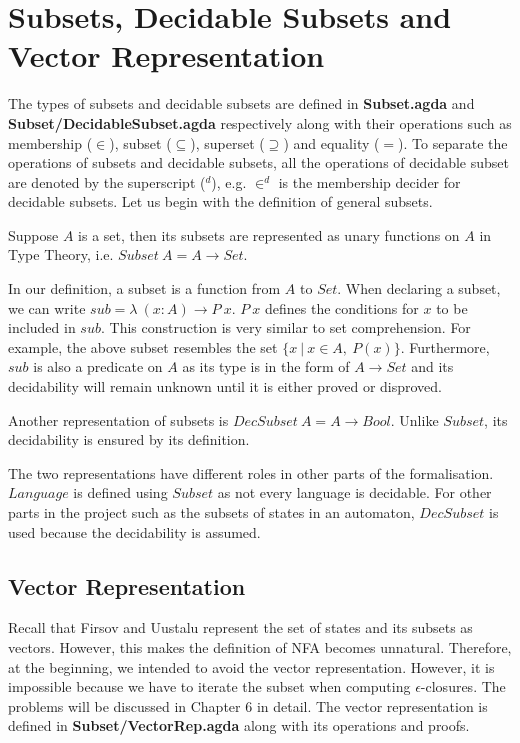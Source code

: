 \section{Subsets, Decidable Subsets and Vector Representation}
\par The types of subsets and decidable subsets are defined in
\textbf{Subset.agda} and \textbf{Subset/DecidableSubset.agda}
respectively along with their operations such as membership (\(\in\)), subset
(\(\subseteq\)), superset (\(\supseteq\)) and equality (\(=\)). To separate the
operations of subsets and decidable subsets, all the operations of
decidable subset are denoted by the superscript (\(^d\)), e.g. \(\in^d\)
is the membership decider for decidable subsets. Let us
begin with the definition of general subsets. 

\begin{defn} 
\noindent Suppose \(A\) is a set, then its
subsets are represented as unary functions on
\(A\) in Type Theory, i.e. \(Subset\ A = A \to Set\). 
\end{defn}

\par In our definition, a subset is a function from \(A\) to
\(Set\). When declaring a subset, we can write \(sub =
\lambda\ (x : A) \to P\ x\). \(P\ x\) defines the conditions for \(x\) to
be included in \(sub\). This construction is
very similar to set comprehension. For example, the above subset
resembles the set \(\{x\ | \ x \in A,\ P(x)\}\). Furthermore, \(sub\) is
also a predicate on \(A\) as its type is in the form of \(A \to
Set\) and its decidability will remain unknown until it is either proved or disproved. 

\begin{defn} 
\noindent Another representation of subsets is \(DecSubset\ A = A \to
Bool\). Unlike \(Subset\), its decidability is ensured by its
definition. 
\end{defn}

\par The two representations have different roles in other parts of the
formalisation. \(Language\) is defined using \(Subset\) as not every
language is decidable. For other parts in the project 
such as the subsets of states in an automaton, \(DecSubset\) is used
because the decidability is assumed. 


\subsection{Vector Representation}
\par Recall that Firsov and Uustalu \cite{firsov2013} represent the
set of states and its subsets as vectors. However, this makes the definition of
NFA becomes unnatural. Therefore, at the beginning, we intended to
avoid the vector representation. However, it is impossible because we have to iterate the subset
when computing \(\epsilon\)-closures. The problems will be discussed in
Chapter 6 in detail. The vector representation is defined in
\textbf{Subset/VectorRep.agda} along with its operations and proofs. 

